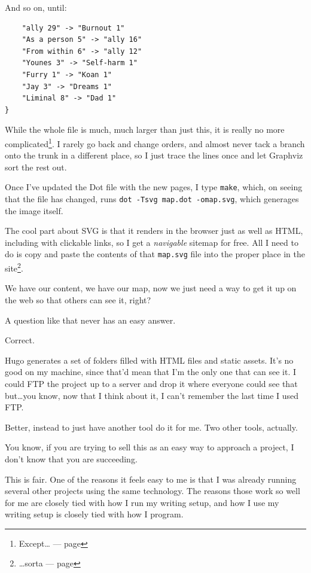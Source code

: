\begin{paracol}{2}
\begin{leftcolumn}
And so on, until:

\begin{verbatim}
    "ally 29" -> "Burnout 1"
    "As a person 5" -> "ally 16"
    "From within 6" -> "ally 12"
    "Younes 3" -> "Self-harm 1"
    "Furry 1" -> "Koan 1"
    "Jay 3" -> "Dreams 1"
    "Liminal 8" -> "Dad 1"
}
\end{verbatim}
\newpage

While the whole file is much, much larger than just this, it is really no more complicated\footnote{Except\ldots{} --- page \pageref{branchdir}}. I rarely go back and change orders, and almost never tack a branch onto the trunk in a different place, so I just trace the lines once and let Graphviz sort the rest out.

Once I've updated the Dot file with the new pages, I type \texttt{make}, which, on seeing that the file has changed, runs \texttt{dot -Tsvg map.dot -omap.svg}, which generages the image itself.

The cool part about SVG is that it renders in the browser just as well as HTML, including with clickable links, so I get a \emph{navigable} sitemap for free. All I need to do is copy and paste the contents of that \texttt{map.svg} file into the proper place in the site\footnote{\ldots{}sorta --- page \pageref{svgfont}}. 

\newpage

We have our content, we have our map, now we just need a way to get it up on the web so that others can see it, right?

\begin{ally}
  A question like that never has an easy answer.
\end{ally}
Correct.

Hugo generates a set of folders filled with HTML files and static assets. It's no good on my machine, since that'd mean that I'm the only one that can see it. I could FTP the project up to a server and drop it where everyone could see that but\ldots{}you know, now that I think about it, I can't remember the last time I used FTP.

Better, instead to just have another tool do it for me. Two other tools, actually.

\begin{ally}
  You know, if you are trying to sell this as an easy way to approach a project, I don't know that you are succeeding.
\end{ally}
This is fair. One of the reasons it feels easy to me is that I was already running several other projects using the same technology. The reasons those work so well for me are closely tied with how I run my writing setup, and how I use my writing setup is closely tied with how I program.


\end{leftcolumn}
\end{paracol}
